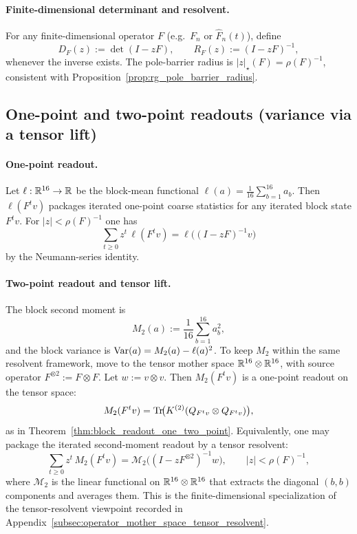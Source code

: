\paragraph{Finite-dimensional determinant and resolvent.}
\MathTag For any finite-dimensional operator $F$ (e.g.\ $F_n$ or $\widehat F_n(t)$), define
\[
D_F(z):=\det(I-zF),
\qquad
R_F(z):=(I-zF)^{-1},
\]
whenever the inverse exists.
The pole-barrier radius is $|z|_\star(F)=\rho(F)^{-1}$, consistent with Proposition~\ref{prop:rg_pole_barrier_radius}.

\subsection{One-point and two-point readouts (variance via a tensor lift)}
\label{subsec:rg_operator_one_two_point_readouts}

\paragraph{One-point readout.}
\MathTag Let $\ell:\mathbb{R}^{16}\to\mathbb{R}$ be the block-mean functional $\ell(a)=\frac{1}{16}\sum_{b=1}^{16}a_b$.
Then $\ell(F^t v)$ packages iterated one-point coarse statistics for any iterated block state $F^t v$.
For $|z|<\rho(F)^{-1}$ one has
\[
\sum_{t\ge 0} z^t\,\ell(F^t v)=\ell\!\bigl((I-zF)^{-1}v\bigr)
\]
by the Neumann-series identity.

\paragraph{Two-point readout and tensor lift.}
\MathTag The block second moment is
\[
M_2(a):=\frac{1}{16}\sum_{b=1}^{16} a_b^2,
\]
and the block variance is $\mathrm{Var}(a)=M_2(a)-\ell(a)^2$.
To keep $M_2$ within the same resolvent framework, move to the tensor mother space $\mathbb{R}^{16}\otimes\mathbb{R}^{16}$, with source operator $F^{\otimes 2}:=F\otimes F$.
Let $w:=v\otimes v$.
Then $M_2(F^t v)$ is a one-point readout on the tensor space:
\[
M_2(F^t v)=\mathrm{Tr}\!\bigl(K^{(2)}(Q_{F^t v}\otimes Q_{F^t v})\bigr),
\]
as in Theorem~\ref{thm:block_readout_one_two_point}.
Equivalently, one may package the iterated second-moment readout by a tensor resolvent:
\[
\sum_{t\ge 0} z^t\,M_2(F^t v)=\mathcal{M}_2\!\bigl((I-zF^{\otimes 2})^{-1}w\bigr),
\qquad |z|<\rho(F)^{-1},
\]
where $\mathcal{M}_2$ is the linear functional on $\mathbb{R}^{16}\otimes\mathbb{R}^{16}$ that extracts the diagonal $(b,b)$ components and averages them.
This is the finite-dimensional specialization of the tensor-resolvent viewpoint recorded in Appendix~\ref{subsec:operator_mother_space_tensor_resolvent}.

